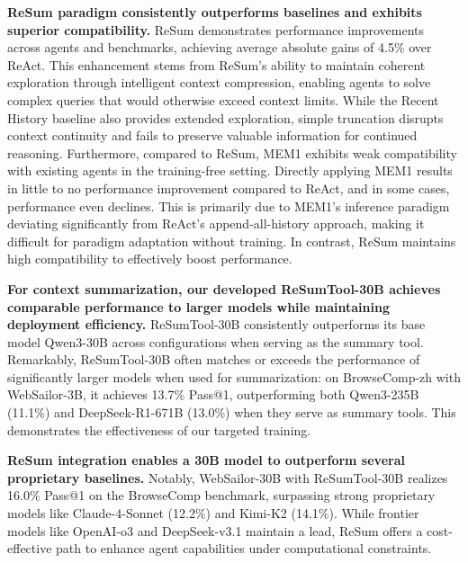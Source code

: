 \textbf{ReSum paradigm consistently outperforms baselines and exhibits superior compatibility.} ReSum demonstrates performance improvements across agents and benchmarks, achieving average absolute gains of 4.5\% over ReAct. This enhancement stems from ReSum's ability to maintain coherent exploration through intelligent context compression, enabling agents to solve complex queries that would otherwise exceed context limits. While the Recent History baseline also provides extended exploration, simple truncation disrupts context continuity and fails to preserve valuable information for continued reasoning. Furthermore, compared to ReSum, MEM1 exhibits weak compatibility with existing agents in the training-free setting. Directly applying MEM1 results in little to no performance improvement compared to ReAct, and in some cases, performance even declines. This is primarily due to MEM1’s inference paradigm deviating significantly from ReAct’s append-all-history approach, making it difficult for paradigm adaptation without training. In contrast, ReSum maintains high compatibility to effectively boost performance.

\textbf{For context summarization, our developed ReSumTool-30B achieves comparable performance to larger models while maintaining deployment efficiency.} ReSumTool-30B consistently outperforms its base model Qwen3-30B across configurations when serving as the summary tool. Remarkably, ReSumTool-30B often matches or exceeds the performance of significantly larger models when used for summarization: on BrowseComp-zh with WebSailor-3B, it achieves 13.7\% Pass@1, outperforming both Qwen3-235B (11.1\%) and DeepSeek-R1-671B (13.0\%) when they serve as summary tools. This demonstrates the effectiveness of our targeted training.

\textbf{ReSum integration enables a 30B model to outperform several proprietary baselines.} Notably, WebSailor-30B with ReSumTool-30B realizes 16.0\% Pass@1 on the BrowseComp benchmark, surpassing strong proprietary models like Claude-4-Sonnet (12.2\%) and Kimi-K2 (14.1\%). While frontier models like OpenAI-o3 and DeepSeek-v3.1 maintain a lead, ReSum offers a cost-effective path to enhance agent capabilities under computational constraints.


